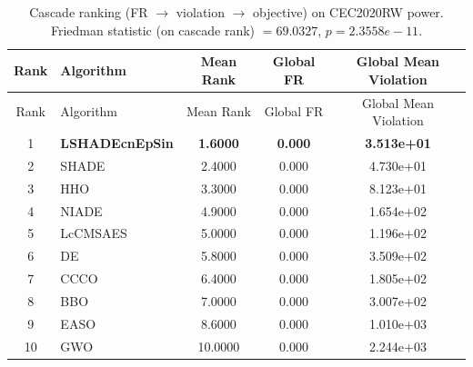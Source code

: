 \begin{center}
\small
\renewcommand{\arraystretch}{1.25}
\begin{longtable}{clccc}
\caption{Cascade ranking (FR $\to$ violation $\to$ objective) on CEC2020RW  power. Friedman statistic (on cascade rank) $=69.0327$, $p=2.3558e-11$.}
\label{tab:cascade_ranking_CEC2020RW_power} \\
\toprule
Rank & Algorithm & Mean Rank & Global FR & Global Mean Violation \\
\midrule
\endfirsthead
\toprule
Rank & Algorithm & Mean Rank & Global FR & Global Mean Violation \\
\midrule
\endhead
1 & \textbf{LSHADEcnEpSin} & \textbf{1.6000} & \textbf{0.000} & \textbf{3.513e+01} \\
2 & SHADE & 2.4000 & 0.000 & 4.730e+01 \\
3 & HHO & 3.3000 & 0.000 & 8.123e+01 \\
4 & NIADE & 4.9000 & 0.000 & 1.654e+02 \\
5 & LcCMSAES & 5.0000 & 0.000 & 1.196e+02 \\
6 & DE & 5.8000 & 0.000 & 3.509e+02 \\
7 & CCCO & 6.4000 & 0.000 & 1.805e+02 \\
8 & BBO & 7.0000 & 0.000 & 3.007e+02 \\
9 & EASO & 8.6000 & 0.000 & 1.010e+03 \\
10 & GWO & 10.0000 & 0.000 & 2.244e+03 \\
\bottomrule
\end{longtable}
\end{center}
